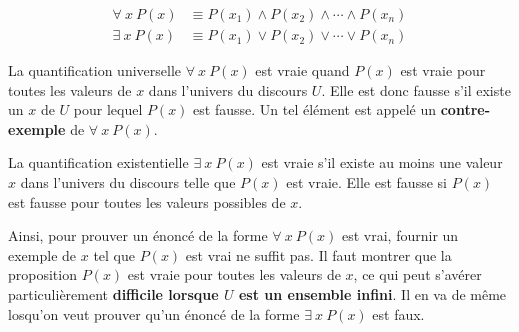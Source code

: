 \documentclass[
  letterpaper,
]{scrbook}
\theoremstyle{plain}
\theoremstyle{definition}
\theoremstyle{definition}
\theoremstyle{remark}
\begin{document}
\begin{align*}
\forall\ x\ P(x) &\equiv P(x_1)\wedge P(x_2) \wedge \cdots \wedge P(x_n) \\
\exists\ x\ P(x) &\equiv P(x_1)\vee P(x_2) \vee \cdots \vee P(x_n)
\end{align*}

La quantification universelle \(\forall\ x\ P(x)\) est vraie quand
\(P(x)\) est vraie pour toutes les valeurs de \(x\) dans l'univers du
discours \(U\). Elle est donc fausse s'il existe un \(x\) de \(U\) pour
lequel \(P(x)\) est fausse. Un tel élément est appelé un
\textbf{contre-exemple} de \(\forall\ x\ P(x)\).

La quantification existentielle \(\exists\ x\ P(x)\) est vraie s'il
existe au moins une valeur \(x\) dans l'univers du discours telle que
\(P(x)\) est vraie. Elle est fausse si \(P(x)\) est fausse pour toutes
les valeurs possibles de \(x\).

Ainsi, pour prouver un énoncé de la forme \(\forall\ x\ P(x)\) est vrai,
fournir un exemple de \(x\) tel que \(P(x)\) est vrai ne suffit pas. Il
faut montrer que la proposition \(P(x)\) est vraie pour toutes les
valeurs de \(x\), ce qui peut s'avérer particulièrement
\textbf{difficile lorsque \(U\) est un ensemble infini}. Il en va de
même losqu'on veut prouver qu'un énoncé de la forme \(\exists\ x\ P(x)\)
est faux.
\end{document}
